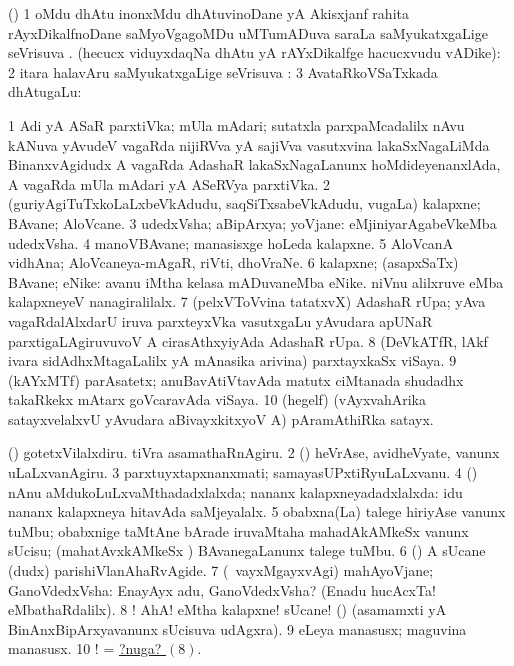 \bentry
{}
\gl{\uparx}
\bmng
(\ravi) 
\bnum
\num{1} oMdu dhAtu inonxMdu dhAtuvinoDane yA Akisxjanf rahita rAyxDikalfnoDane saMyoVgagoMDu uMTumADuva saraLa saMyukatxgaLige seVrisuva \uparx. (hecucx viduyxdaqNa dhAtu yA rAYxDikalfge hacucxvudu vADike):  
\num{2} itara halavAru saMyukatxgaLige seVrisuva \uparx:  
\num{3} AvataRkoVSaTxkada dhAtugaLu:  
\enum
\emng
\eentry

\bentry
{}
\gl{\nA}
\bmng
\bnum
\num{1} Adi yA ASaR parxtiVka; mUla mAdari; sutatxla parxpaMcadalilx nAvu kANuva yAvudeV vagaRda nijiRVva yA sajiVva vasutxvina lakaSxNagaLiMda BinanxvAgidudx A vagaRda AdashaR lakaSxNagaLanunx hoMdideyenanxlAda, A vagaRda mUla mAdari yA ASeRVya parxtiVka. 
\num{2} (guriyAgiTuTxkoLaLxbeVkAdudu, saqSiTxsabeVkAdudu, \mo vugaLa) kalapxne; BAvane; AloVcane. 
\num{3} udedxVsha; aBipArxya; yoVjane:  eMjiniyarAgabeVkeMba udedxVsha. 
\num{4} manoVBAvane; manasisxge hoLeda kalapxne. 
\num{5} AloVcanA vidhAna; AloVcaneya-mAgaR, riVti, dhoVraNe. 
\num{6} kalapxne; (asapxSaTx) BAvane; eNike:  avanu iMtha kelasa mADuvaneMba eNike.  niVnu alilxruve eMba kalapxneyeV nanagiralilalx. 
\num{7} (pelxVToVvina tatatxvX) AdashaR rUpa; yAva vagaRdalAlxdarU iruva parxteyxVka vasutxgaLu yAvudara apUNaR parxtigaLAgiruvuvoV A cirasAthxyiyAda AdashaR rUpa. 
\num{8} (DeVkATfR, lAkf ivara sidAdhxMtagaLalilx yA mAnasika arivina) parxtayxkaSx viSaya. 
\num{9} (kAYxMTf) parAsatetx; anuBavAtiVtavAda matutx ciMtanada shudadhx takaRkekx mAtarx goVcaravAda viSaya. 
\num{10} (hegelf) (vAyxvahArika satayxvelalxvU yAvudara aBivayxkitxyoV A) pAramAthiRka satayx. 
\enum
\emng

\noindent
\gl{\nuga}
\bmng
\bnum
{}  (\AmA) 
\banum
{} gotetxVilalxdiru. 
 tiVra asamathaRnAgiru. 
\eanum
\numie
\num{2}   (\AmA) heVrAse, avidheVyate, \mo vanunx uLaLxvanAgiru. 
\num{3}  parxtuyxtapxnanxmati; samayasUPxtiRyuLaLxvanu. 
\num{4}  (\AmA) nAnu aMdukoLuLxvaMthadadxlalxda; nananx kalapxneyadadxlalxda:  idu nananx kalapxneya hitavAda saMjeyalalx. 
\num{5}  obabxna(La) talege hiriyAse \mo vanunx tuMbu; obabxnige taMtAne bArade iruvaMtaha mahadAkAMkeSx \mo vanunx sUcisu; (mahatAvxkAMkeSx \mo) BAvanegaLanunx talege tuMbu. 
\num{6}  (\AmA) A sUcane (\mo dudx) parishiVlanAhaRvAgide. 
\num{7}  (\sA\ vayxMgayxvAgi) mahAyoVjane; GanoVdedxVsha:  EnayAyx adu, GanoVdedxVsha? (Enadu hucAcxTa! eMbathaRdalilx). 
\hypertarget{idea nuga8}{} 
\num{8} ! AhA! eMtha kalapxne! sUcane! (\AmA) (asamamxti yA BinAnxBipArxyavanunx sUcisuva udAgxra). 
\num{9}  eLeya manasusx; maguvina manasusx. 
\num{10} ! = \hyperlink{idea nuga8}{?nuga? \((8)\)}. 
\enum
\emng
\eentry

